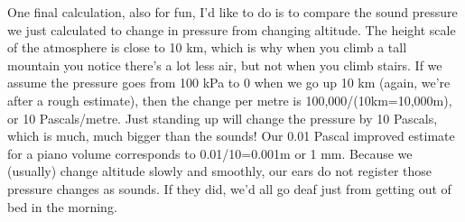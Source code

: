 \documentclass[letterpaper,11pt,preprint]{aastex}
\begin{document}
One final calculation, also for fun, I'd like to do is to compare the
sound pressure we just calculated to change in pressure from changing
altitude.  The height scale of the atmosphere is close to 10 km, which
is why when you climb a tall mountain you notice there's a lot less
air, but not when you climb stairs.  If we assume the pressure goes
from 100 kPa to 0 when we go up 10 km (again, we're after a rough
estimate), then the change per metre is 100,000/(10km=10,000m), or 10
Pascals/metre.  Just standing up will change the pressure by 10
Pascals, which is much, much bigger than the sounds!  Our 0.01 Pascal
improved estimate for a piano volume corresponds to 0.01/10=0.001m or 1
mm.  Because we (usually) change altitude slowly and smoothly, our ears
do not register those pressure changes as sounds.  If they did, we'd
all go deaf just from getting out of bed in the morning.  
\end{document}
